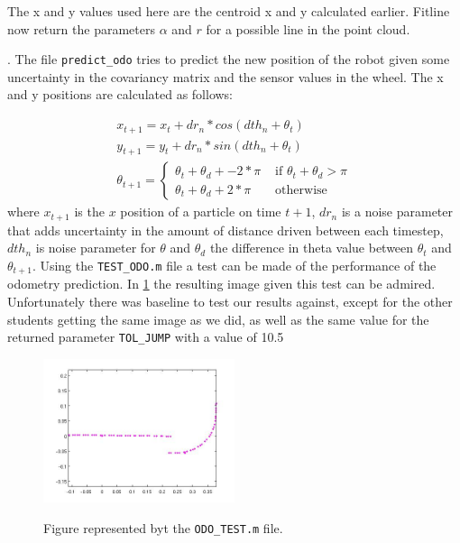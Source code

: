 \documentclass[a4paper, 20pt]{article}
\begin{document}
The x and y values used here are the centroid x and y calculated earlier.
Fitline now return the parameters $\alpha$ and $r$ for a possible line in the
point cloud.

. The file \texttt{predict\_odo} tries to predict the new position of the robot
given some uncertainty in the covariancy matrix and the sensor values in the
wheel.
The x and y positions are calculated as follows:

\begin{align*}
    x_{t+1} = x_{t} + dr_n * cos(dth_n + \theta_t)\\
    y_{t+1} = y_{t} + dr_n * sin(dth_n + \theta_t)\\
\theta_{t+1} = \left\{ \begin{array}{rl}
 \theta_t + \theta_d + -2*\pi &\mbox{ if $\theta_t + \theta_d > \pi$} \\
 \theta_t + \theta_d + 2*\pi&\mbox{ otherwise}
\end{array} \right.
\end{align*}
where $x_{t+1}$ is the $x$ position of a particle on time $t+1$, $dr_n$ is a noise
parameter that adds uncertainty in the amount of distance driven between each
timestep, $dth_n$ is noise parameter for $\theta$ and $\theta_d$ the
difference in theta value between $\theta_t$  and $\theta_{t+1}$.
Using the \texttt{TEST\_ODO.m} file a test can be made of the performance of the
odometry prediction. In \ref{fig:odo_test} the resulting image given this test
can be admired. Unfortunately there was baseline to test our results against,
except for the other students getting the same image as we did, as well as the
same value for the returned parameter \texttt{TOL\_JUMP} with a value of 10.5

\begin{figure}[!ht]
\centering
  \includegraphics[width=0.5\textwidth]{Odo_test.jpg}
  \label{fig:odo_test}
  \caption{Figure represented byt the \texttt{ODO\_TEST.m} file. } 
\end{figure}
\end{document}
